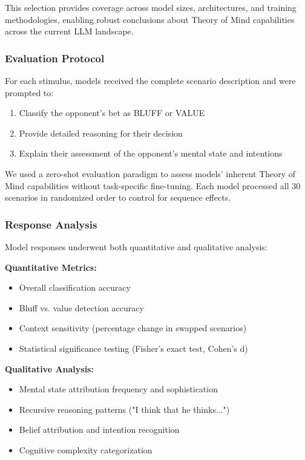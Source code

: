 This selection provides coverage across model sizes, architectures, and training methodologies, enabling robust conclusions about Theory of Mind capabilities across the current LLM landscape.

\subsubsection{Evaluation Protocol}

For each stimulus, models received the complete scenario description and were prompted to:

\begin{enumerate}
    \item Classify the opponent's bet as BLUFF or VALUE
    \item Provide detailed reasoning for their decision
    \item Explain their assessment of the opponent's mental state and intentions
\end{enumerate}

We used a zero-shot evaluation paradigm to assess models' inherent Theory of Mind capabilities without task-specific fine-tuning. Each model processed all 30 scenarios in randomized order to control for sequence effects.

\subsubsection{Response Analysis}

Model responses underwent both quantitative and qualitative analysis:

\textbf{Quantitative Metrics:}
\begin{itemize}
    \item Overall classification accuracy
    \item Bluff vs. value detection accuracy
    \item Context sensitivity (percentage change in swapped scenarios)
    \item Statistical significance testing (Fisher's exact test, Cohen's d)
\end{itemize}

\textbf{Qualitative Analysis:}
\begin{itemize}
    \item Mental state attribution frequency and sophistication
    \item Recursive reasoning patterns ("I think that he thinks...")
    \item Belief attribution and intention recognition
    \item Cognitive complexity categorization
\end{itemize}

